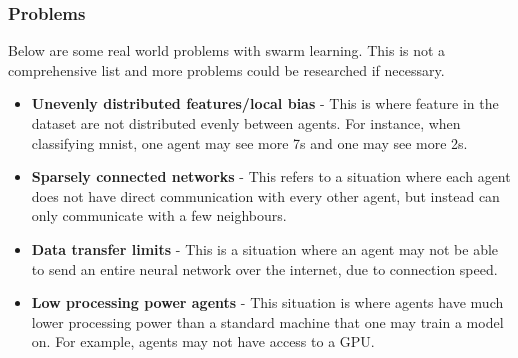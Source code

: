 \subsubsection{Problems}
Below are some real world problems with swarm learning. This is not a comprehensive list and more problems could be researched if necessary.
\begin{itemize}
	\item \textbf{Unevenly distributed features/local bias} - This is where feature in the dataset are not distributed evenly between agents. For instance, when classifying mnist, one agent may see more 7s and one may see more 2s.
	\item \textbf{Sparsely connected networks} - This refers to a situation where each agent does not have direct communication with every other agent, but instead can only communicate with a few neighbours.
	\item \textbf{Data transfer limits} - This is a situation where an agent may not be able to send an entire neural network over the internet, due to connection speed.
	\item \textbf{Low processing power agents} - This situation is where agents have much lower processing power than a standard machine that one may train a model on. For example, agents may not have access to a GPU.
\end{itemize}	

